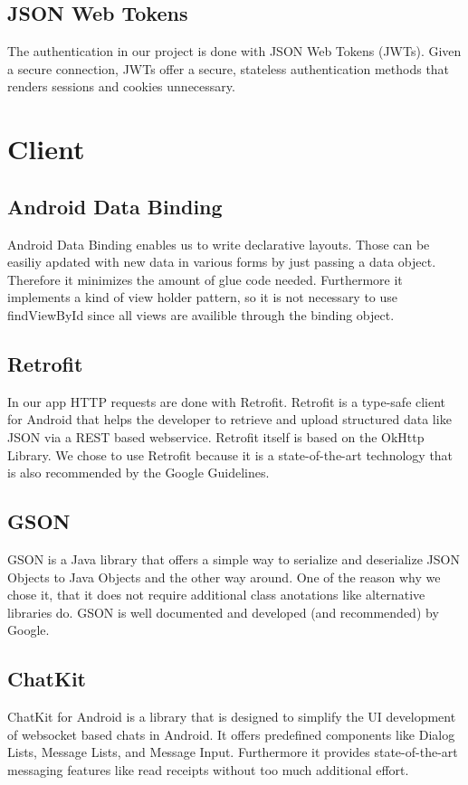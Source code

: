 \documentclass[11pt, accentcolor=tud1c]{tudreport}
\begin{document}
\subsection{JSON Web Tokens}\label{sec:json_web_tokens}
The authentication in our project is done with JSON Web Tokens (JWTs)\cite{jwt}. Given a secure connection, JWTs offer a secure, stateless authentication methods that renders sessions and cookies unnecessary.

\section{Client}\label{sec:client}
\subsection{Android Data Binding}
Android Data Binding \cite{databinding} enables us to write declarative layouts. Those can be easiliy apdated with new data in various forms by just passing a data object. Therefore it minimizes the amount of glue code needed. Furthermore it implements a kind of view holder pattern, so it is not necessary to use findViewById since all views are availible through the binding object.
\subsection{Retrofit}
In our app HTTP requests are done with Retrofit\cite{retrofit}. Retrofit is a type-safe client for Android that helps the developer to retrieve and upload structured data like JSON via a REST based webservice. Retrofit itself is based on the OkHttp Library. We chose to use Retrofit because it is a state-of-the-art technology that is also recommended by the Google Guidelines.
\subsection{GSON}
GSON\cite{gson} is a Java library that offers a simple way to serialize and deserialize JSON Objects to Java Objects and the other way around. One of the reason why we chose it, that it does not require additional class anotations like alternative libraries do. GSON is well documented and developed (and recommended) by Google.
\subsection{ChatKit}
ChatKit for Android \cite{chatkit} is a library that is designed to simplify the UI development of websocket based chats in Android. It offers predefined components like Dialog Lists, Message Lists, and Message Input. Furthermore it provides state-of-the-art messaging features like read receipts without too much additional effort.
\end{document}
